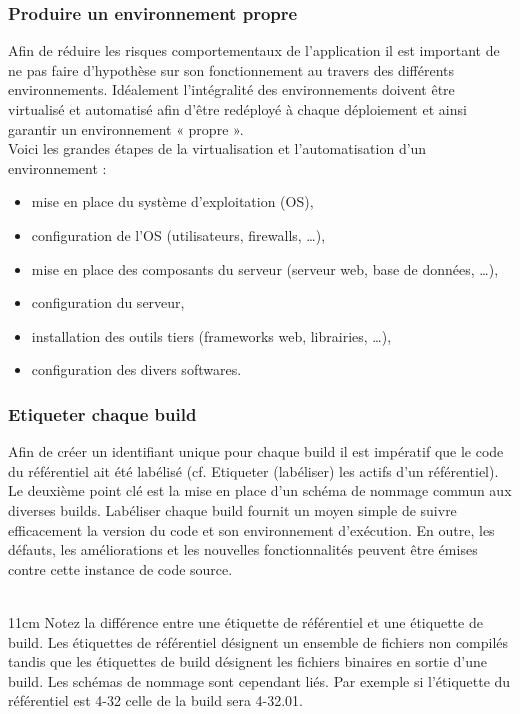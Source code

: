       \subsubsection{Produire un environnement propre}
      Afin de réduire les risques comportementaux de l’application il est important de ne pas faire d’hypothèse sur son fonctionnement au travers des différents environnements. Idéalement l’intégralité des environnements doivent être virtualisé et automatisé afin d’être redéployé à chaque déploiement et ainsi garantir un environnement « propre ».\\
      Voici les grandes étapes de la virtualisation et l’automatisation d’un environnement :\\
      \begin{itemize}
        \item mise en place du système d’exploitation (OS),
        \item configuration de l’OS (utilisateurs, firewalls, …),
        \item mise en place des composants du serveur (serveur web, base de données, …),
        \item configuration du serveur,
        \item installation des outils tiers (frameworks web, librairies, …),
        \item	configuration des divers softwares.\\
      \end{itemize}

      \subsubsection{Etiqueter chaque build}
      Afin de créer un identifiant unique pour chaque build il est impératif que le code du référentiel ait été labélisé (cf. Etiqueter (labéliser) les actifs d’un référentiel). Le deuxième point clé est la mise en place d’un schéma de nommage commun aux diverses builds. Labéliser chaque build fournit un moyen simple de suivre efficacement la version du code et son environnement d’exécution. En outre, les défauts, les améliorations et les nouvelles fonctionnalités peuvent être émises contre cette instance de code source.\\\\

      \begin {boxedminipage} {11cm}
        Notez la différence entre une étiquette de référentiel et une étiquette de build. Les étiquettes de référentiel désignent un ensemble de fichiers non compilés tandis que les étiquettes de build désignent les fichiers binaires en sortie d’une build. Les schémas de nommage sont cependant liés. Par exemple si l’étiquette du référentiel est 4-32 celle de la build sera 4-32.01.
      \end {boxedminipage}\\

